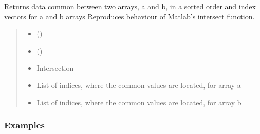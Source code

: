 \documentclass[letterpaper,10pt,english]{sphinxmanual}
\begin{document}
\begin{fulllineitems}
\label{\detokenize{misc:glomar_gridding.utils.intersect_mtlb}}
\pysigstartsignatures
\pysiglinewithargsret
{}
{\sphinxparamcomma {}}
{}
\pysigstopsignatures
\sphinxAtStartPar
Returns data common between two arrays, a and b, in a sorted order and index
vectors for a and b arrays Reproduces behaviour of Matlab’s intersect
function.
\begin{quote}\begin{description}
\begin{itemize}
\item {}
\sphinxAtStartPar
{} ()

\item {}
\sphinxAtStartPar
{} ()

\end{itemize}

\sphinxAtStartPar
\begin{itemize}
\item {}
\sphinxAtStartPar
Intersection

\item {}
\sphinxAtStartPar
List of indices, where the common values are located, for array a

\item {}
\sphinxAtStartPar
List of indices, where the common values are located, for array b

\end{itemize}


\sphinxAtStartPar
{}

\end{description}\end{quote}
\subsubsection*{Examples}


\end{fulllineitems}
\end{document}
